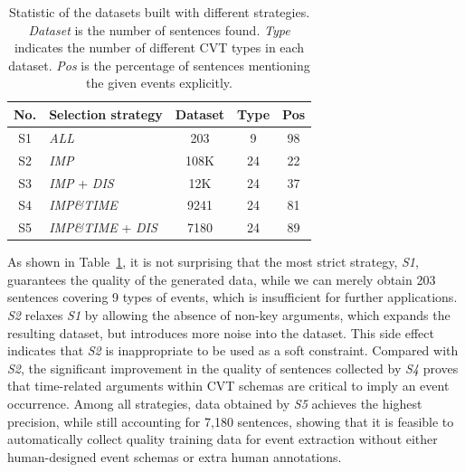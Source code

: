 \begin{table}[h]
\small
\centering
\begin{tabular}{|c|l|c|c|c|} \hline
	No. & Selection strategy & Dataset & Type & Pos \\ \hline
	S1 & \emph{ALL} & 203 & 9 & 98 \\ \hline
	S2 & \emph{IMP} & 108K & 24 & 22 \\ \hline
	S3 & \emph{IMP} + \emph{DIS} & 12K & 24 & 37 \\ \hline
	S4 & \emph{IMP\&TIME} & 9241 & 24 & 81 \\ \hline
	S5 & \emph{IMP\&TIME} + \emph{DIS} & 7180 & 24 & 89 \\ \hline
\end{tabular}
\caption{Statistic of the datasets built with different strategies. 
\textit{Dataset} is the number of sentences found. \textit{Type} indicates the number of different CVT types in each dataset.  \textit{Pos} is the percentage of sentences mentioning the given events explicitly. \label{tab:3}}
\end{table}

As shown in Table~\ref{tab:3}, it is not surprising that the most strict strategy, \emph{S1}, guarantees the quality of the generated data, while we can merely obtain 203 sentences covering 9 types of events, which is insufficient for further applications. \emph{S2} relaxes \emph{S1} by allowing the absence of non-key arguments, which expands the resulting dataset, but introduces more noise into the dataset. 
This side effect indicates that \emph{S2} is inappropriate to be used as a soft constraint. Compared with \emph{S2}, the significant improvement in the quality of sentences collected by \emph{S4} proves that time-related arguments within CVT schemas are critical to imply an event occurrence. Among all strategies, data obtained by \emph{S5} achieves the highest precision, while still accounting for 7,180 sentences, showing that it is feasible to automatically collect quality training data for event extraction without either human-designed event schemas or extra human annotations.     


